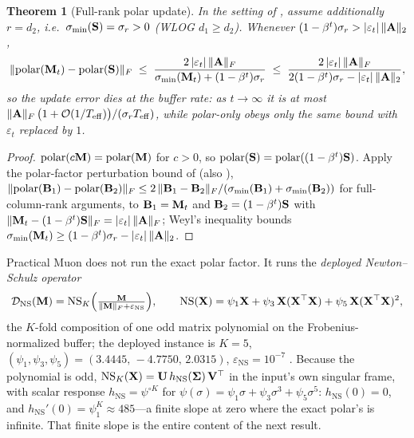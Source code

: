 \documentclass[11pt,a4paper]{article}
\newtheorem{theorem}{Theorem}
\theoremstyle{remark}
\newcommand{\Teff}{T_{\mathrm{eff}}}
\DeclareMathOperator{\polar}{polar}
\begin{document}
\begin{theorem}[Full-rank polar update]
\label{thm:polarupdate}
In the setting of , assume additionally $r=d_2$, i.e.\ $\sigma_{\min}(\mathbf{S})=\sigma_r>0$ (WLOG $d_1\ge d_2$).
Whenever $(1-\beta^t)\sigma_r>\lvert\varepsilon_t\rvert\,\lVert\mathbf{A}\rVert_2$,
\[
\lVert\polar(\Mbf_t)-\polar(\Sbf)\rVert_F
\;\le\;\frac{2\,\lvert\varepsilon_t\rvert\,\lVert\Abf\rVert_F}{\sigma_{\min}(\Mbf_t)+(1-\beta^t)\sigma_r}
\;\le\;\frac{2\,\lvert\varepsilon_t\rvert\,\lVert\Abf\rVert_F}{2(1-\beta^t)\sigma_r-\lvert\varepsilon_t\rvert\,\lVert\Abf\rVert_2},
\]
so the update error dies at the buffer rate: as $t\to\infty$ it is at most $\lVert\Abf\rVert_F\,\bigl(1+\Ocal(1/\Teff)\bigr)/(\sigma_r\Teff)$, while polar-only obeys only the same bound with $\varepsilon_t$ replaced by $1$.
\end{theorem}

\begin{proof}
$\polar(c\Mbf)=\polar(\Mbf)$ for $c>0$, so $\polar(\Sbf)=\polar((1-\beta^t)\Sbf)$.
Apply the polar-factor perturbation bound of \citet{li1995polar} (also \citealp[Ch.~8]{higham2008functions}), $\lVert\polar(\Bbf_1)-\polar(\Bbf_2)\rVert_F\le2\,\lVert\Bbf_1-\Bbf_2\rVert_F/(\sigma_{\min}(\Bbf_1)+\sigma_{\min}(\Bbf_2))$ for full-column-rank arguments, to $\mathbf{B}_1=\mathbf{M}_t$ and $\mathbf{B}_2=(1-\beta^t)\mathbf{S}$ with $\lVert\mathbf{M}_t-(1-\beta^t)\mathbf{S}\rVert_F=\lvert\varepsilon_t\rvert\,\lVert\mathbf{A}\rVert_F$; Weyl's inequality bounds $\sigma_{\min}(\mathbf{M}_t)\ge(1-\beta^t)\sigma_r-\lvert\varepsilon_t\rvert\,\lVert\mathbf{A}\rVert_2$.
\end{proof}

Practical Muon does not run the exact polar factor.
It runs the \emph{deployed Newton--Schulz operator}
\begin{equation}
\label{eq:deployed}
\mathcal{D}_{\mathrm{NS}}(\mathbf{M})=\mathrm{NS}_K\Bigl(\tfrac{\mathbf{M}}{\lVert\mathbf{M}\rVert_F+\varepsilon_{\mathrm{NS}}}\Bigr),\qquad
\mathrm{NS}(\mathbf{X})=\psi_1\mathbf{X}+\psi_3\,\mathbf{X}(\mathbf{X}^\top\mathbf{X})+\psi_5\,\mathbf{X}(\mathbf{X}^\top\mathbf{X})^2,
\end{equation}
the $K$-fold composition of one odd matrix polynomial on the Frobenius-normalized buffer; the deployed instance is $K=5$, $(\psi_1,\psi_3,\psi_5)=(3.4445,\,-4.7750,\,2.0315)$, $\varepsilon_{\mathrm{NS}}=10^{-7}$ \citep{jordan2024muon}.
Because the polynomial is odd, $\mathrm{NS}_K(\mathbf{X})=\mathbf{U}\,h_{\mathrm{NS}}(\bm{\Sigma})\,\mathbf{V}^\top$ in the input's own singular frame, with scalar response $h_{\mathrm{NS}}=\psi^{\circ K}$ for $\psi(\sigma)=\psi_1\sigma+\psi_3\sigma^3+\psi_5\sigma^5$: $h_{\mathrm{NS}}(0)=0$, and $h_{\mathrm{NS}}'(0)=\psi_1^K\approx485$---a finite slope at zero where the exact polar's is infinite.
That finite slope is the entire content of the next result.
\end{document}
